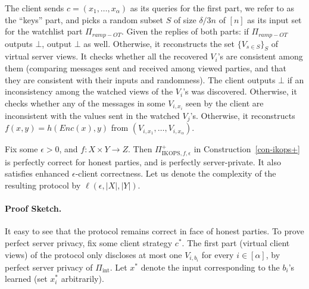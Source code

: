 \documentclass{llncs}
\newcommand{\INT}{\Pi_{\operatorname{int}}}
\begin{document}
{\begin{construction}
\begin{enumerate}
	The client sends $c=(x_1,\ldots,x_\alpha)$ as its queries for the first part, we refer to as the ``keys'' part, and picks a random subset $S$ of size $\delta/3 n$ of $[n]$ as its input set for the watchlist part $\Pi_{ramp-OT}$.
	Given the replies of both parts: if $\Pi_{ramp-OT}$ outputs $\bot$, output $\bot$ as well. Otherwise, it reconstructs the set $\{V_{s\in S}\}_S$ of virtual server views.
	It checks whether all the recovered $V_i$'s are consistent among them (comparing messages sent and received among viewed parties, and that they are consistent with their inputs and randomness).
	The client outputs $\bot$ if an inconsistency among the watched views of the $V_i$'s was discovered. Otherwise, it checks whether any of the messages in some $V_{i,x_i}$ seen by the client are inconsistent with the values sent in the watched $V_j$'s. Otherwise, it reconstructs $f(x,y)=h(Enc(x),y)$ from $(V_{i,x_1},\ldots,V_{i,x_\alpha})$. 
	
	\end{enumerate}
\end{construction}	

\begin{lemma}\label{thm-pcl}
	Fix some $\epsilon>0$, and $f:X\times Y\rightarrow Z$. Then $\Pi^+_{\text{IKOPS},f,\epsilon}$ in
	Construction~\ref{con-ikops+} is perfectly correct for honest parties, and is perfectly server-private. It also satisfies enhanced $\epsilon$-client correctness. Let us denote the complexity of the resulting protocol by $\ell(\epsilon,|X|,|Y|)$.
\end{lemma}



\paragraph{Proof Sketch.} It easy to see that the protocol remains correct in face of honest parties. 
To prove  perfect server privacy, fix some client strategy $c^*$. The first part (virtual client views) of the protocol only discloses at most one $V_{i,b_i}$ for every $i\in[\alpha]$, by perfect server privacy of $\INT$. Let $x^*$ denote the input corresponding to the $b_i$'s learned (set $x^*_i$ arbitrarily).

}
\end{document}
